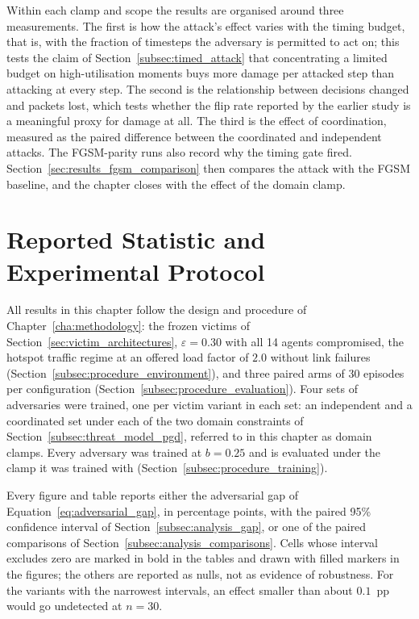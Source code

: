 Within each clamp and scope the results are organised around three measurements. The
first is how the attack's effect varies with the timing budget, that is, with the
fraction of timesteps the adversary is permitted to act on; this tests the claim of
Section~\ref{subsec:timed_attack} that concentrating a limited budget on
high-utilisation moments buys more damage per attacked step than attacking at every
step. The second is the relationship between decisions changed and packets lost, which
tests whether the flip rate reported by the earlier study is a meaningful proxy for
damage at all. The third is the effect of coordination, measured as the paired
difference between the coordinated and independent attacks. The FGSM-parity runs also
record why the timing gate fired. Section~\ref{sec:results_fgsm_comparison} then
compares the attack with the FGSM baseline, and the chapter closes with the effect of
the domain clamp.

\section{Reported Statistic and Experimental Protocol}
\label{sec:results_protocol}

All results in this chapter follow the design and procedure of
Chapter~\ref{cha:methodology}: the frozen victims of
Section~\ref{sec:victim_architectures}, $\varepsilon = 0.30$ with all 14 agents
compromised, the hotspot traffic regime at an offered load factor of $2.0$ without link
failures (Section~\ref{subsec:procedure_environment}), and three paired arms of 30
episodes per configuration (Section~\ref{subsec:procedure_evaluation}). Four sets of
adversaries were trained, one per victim variant in each set: an independent and a
coordinated set under each of the two domain constraints of
Section~\ref{subsec:threat_model_pgd}, referred to in this chapter as domain clamps.
Every adversary was trained at $b = 0.25$ and is evaluated under the clamp it was
trained with (Section~\ref{subsec:procedure_training}).

Every figure and table reports either the adversarial gap of
Equation~\eqref{eq:adversarial_gap}, in percentage points, with the paired 95\%
confidence interval of Section~\ref{subsec:analysis_gap}, or one of the paired
comparisons of Section~\ref{subsec:analysis_comparisons}. Cells whose interval excludes
zero are marked in bold in the tables and drawn with filled markers in the figures; the
others are reported as nulls, not as evidence of robustness. For the variants with the
narrowest intervals, an effect smaller than about $0.1$~pp would go undetected at
$n = 30$.


